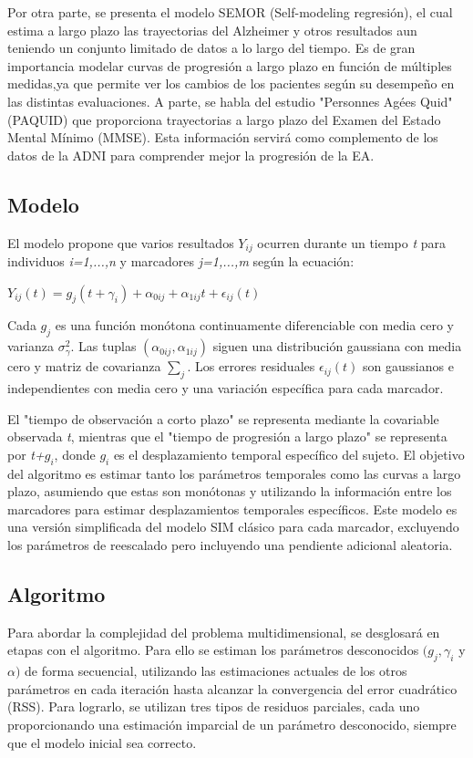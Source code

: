 	Por otra parte, se presenta el modelo SEMOR (Self-modeling regresión), el cual estima a largo plazo las trayectorias del Alzheimer y otros resultados aun teniendo un conjunto limitado de datos a lo largo del tiempo. Es de gran importancia modelar curvas de progresión a largo plazo en función de múltiples medidas,ya que permite ver los cambios de los pacientes según su desempeño en las distintas evaluaciones. A parte, se habla del estudio "Personnes Agées Quid" (PAQUID) que proporciona trayectorias a largo plazo del Examen del Estado Mental Mínimo (MMSE). Esta información servirá como complemento de los datos de la ADNI para comprender mejor la progresión de la EA.
	
	\subsection{Modelo}
	El modelo propone que varios resultados $Y_{ij}$ ocurren durante un tiempo \textit{t} para individuos \textit{i=1,...,n} y marcadores \textit{j=1,...,m} según la ecuación:
	\begin{center}
		$Y_{ij}(t)=g_{j}(t+\gamma_{i})+\alpha_{0ij}+\alpha_{1ij}t+\epsilon_{ij}(t)$
	\end{center}
	
	Cada $g_{j}$ es una función monótona continuamente diferenciable con media cero y varianza $\sigma_{\gamma}^{2}$. Las tuplas $(\alpha_{0ij},\alpha_{1ij})$ siguen una distribución gaussiana con media cero y matriz de covarianza $\sum_{j}$. Los errores residuales $\epsilon_{ij}(t)$ son gaussianos e independientes con media cero y una variación específica para cada marcador.
	
	El "tiempo de observación a corto plazo" se representa mediante la covariable observada \textit{t}, mientras que el "tiempo de progresión a largo plazo" se representa por \textit{t+$g_{i}$}, donde $g_{i}$ es el desplazamiento temporal específico del sujeto. El objetivo del algoritmo es estimar tanto los parámetros temporales como las curvas a largo plazo, asumiendo que estas son monótonas y utilizando la información entre los marcadores para estimar desplazamientos temporales específicos. Este modelo es una versión simplificada del modelo SIM clásico para cada marcador, excluyendo los parámetros de reescalado pero incluyendo una pendiente adicional aleatoria.\cite{donohue2014estimating}
	
	\subsection{Algoritmo}
	Para abordar la complejidad del problema multidimensional, se desglosará en etapas con el algoritmo. Para ello se estiman los parámetros desconocidos $(g_{j}, \gamma_{i}$ y $\alpha)$ de forma secuencial, utilizando las estimaciones actuales de los otros parámetros en cada iteración hasta alcanzar la convergencia del error cuadrático (RSS). Para lograrlo, se utilizan tres tipos de residuos parciales, cada uno proporcionando una estimación imparcial de un parámetro desconocido, siempre que el modelo inicial sea correcto.\\
	
